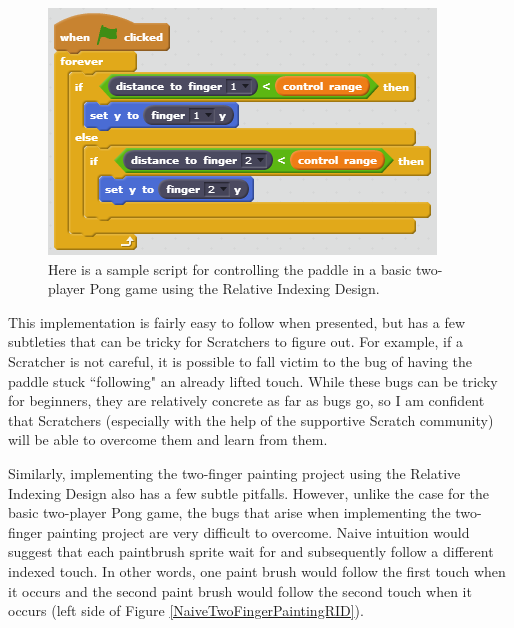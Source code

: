\begin{figure}
\centering
\includegraphics{images/BasicTwoPlayerPongRID.PNG}
\caption[Sample Relative Indexing Design Script For Basic Two-Player Pong]{Here is a sample script for controlling the paddle in a basic two-player Pong game using the Relative Indexing Design.}
\label{BasicTwoPlayerPongRID}
\end{figure}

This implementation is fairly easy to follow when presented, but has a few subtleties that can be tricky for Scratchers to figure out. For example, if a Scratcher is not careful, it is possible to fall victim to the bug of having the paddle stuck ``following" an already lifted touch. While these bugs can be tricky for beginners, they are relatively concrete as far as bugs go, so I am confident that Scratchers (especially with the help of the supportive Scratch community) will be able to overcome them and learn from them. 

Similarly, implementing the two-finger painting project using the Relative Indexing Design also has a few subtle pitfalls. However, unlike the case for the basic two-player Pong game, the bugs that arise when implementing the two-finger painting project are very difficult to overcome. Naive intuition would suggest that each paintbrush sprite wait for and subsequently follow a different indexed touch. In other words, one paint brush would follow the first touch when it occurs and the second paint brush would follow the second touch when it occurs (left side of Figure \ref{NaiveTwoFingerPaintingRID}).

